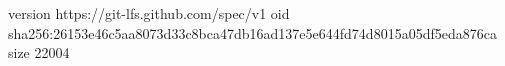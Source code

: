 version https://git-lfs.github.com/spec/v1
oid sha256:26153e46c5aa8073d33c8bca47db16ad137e5e644fd74d8015a05df5eda876ca
size 22004
